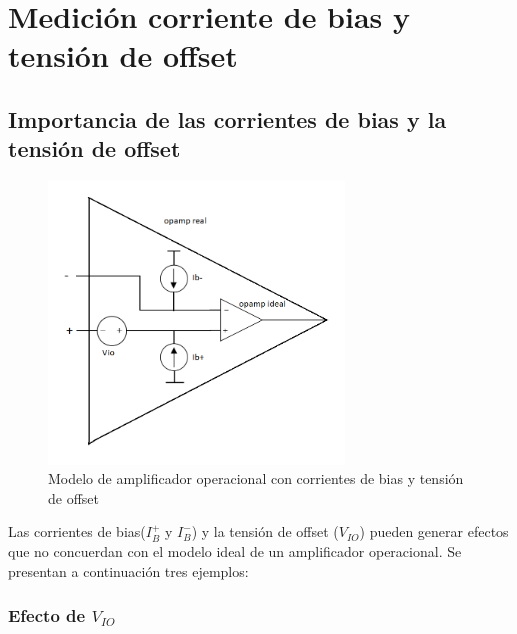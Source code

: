 \documentclass[../../main.tex]{subfiles}
\begin{document}
\section{Medici\'on corriente de bias y tensi\'on de offset}

\subsection{Importancia de las corrientes de bias y la tensi\'on de offset}



\begin{figure}[htb]	%
	\centering
	\includegraphics[width=0.7\textwidth]{imagenes/modelo_opamp_vio_ibias.png}
	\caption{Modelo de amplificador operacional con corrientes de bias y tensi\'on de offset}
	\label{fig:ej_3_modelo_opamp_vio_ibias}
\end{figure}






Las corrientes de bias($I_B^+$ y $I_B^-$) y la tensi\'on de offset ($V_{IO}$) pueden generar efectos que no concuerdan con el modelo ideal de un amplificador operacional. Se presentan a continuaci\'on tres ejemplos:

\subsubsection*{Efecto de $V_{IO}$}
\end{document}
